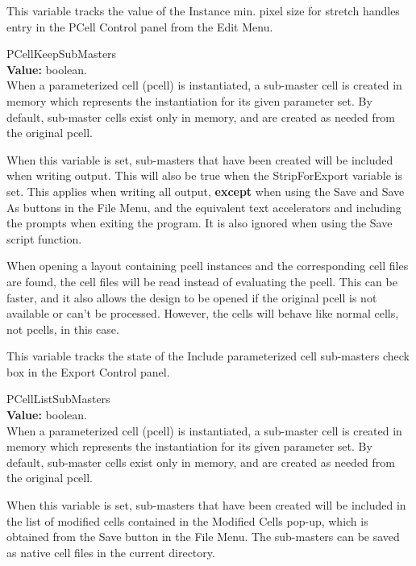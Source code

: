 \begin{description}
This variable tracks the value of the {\cb Instance min.  pixel size
for stretch handles} entry in the {\cb PCell Control} panel from the
{\cb Edit Menu}.

\item{\et PCellKeepSubMasters}\\
{\bf Value:} boolean.\\
When a parameterized cell (pcell) is instantiated, a sub-master cell
is created in memory which represents the instantiation for its given
parameter set.  By default, sub-master cells exist only in memory, and
are created as needed from the original pcell.

When this variable is set, sub-masters that have been created will be
included when writing output.  This will also be true when the {\cb
StripForExport} variable is set.  This applies when writing all
output, {\bf except} when using the {\cb Save} and {\cb Save As}
buttons in the {\cb File Menu}, and the equivalent text accelerators
and including the prompts when exiting the program.  It is also
ignored when using the {\vt Save} script function.

When opening a layout containing pcell instances and the corresponding
cell files are found, the cell files will be read instead of
evaluating the pcell.  This can be faster, and it also allows the
design to be opened if the original pcell is not available or can't be
processed.  However, the cells will behave like normal cells, not
pcells, in this case.

This variable tracks the state of the {\cb Include parameterized cell
sub-masters} check box in the {\cb Export Control} panel.

\item{\et PCellListSubMasters}\\
{\bf Value:} boolean.\\
When a parameterized cell (pcell) is instantiated, a sub-master cell
is created in memory which represents the instantiation for its given
parameter set.  By default, sub-master cells exist only in memory, and
are created as needed from the original pcell.

When this variable is set, sub-masters that have been created will be
included in the list of modified cells contained in the {\cb Modified
Cells} pop-up, which is obtained from the {\cb Save} button in the
{\cb File Menu}.  The sub-masters can be saved as native cell files in
the current directory.


\end{description}
